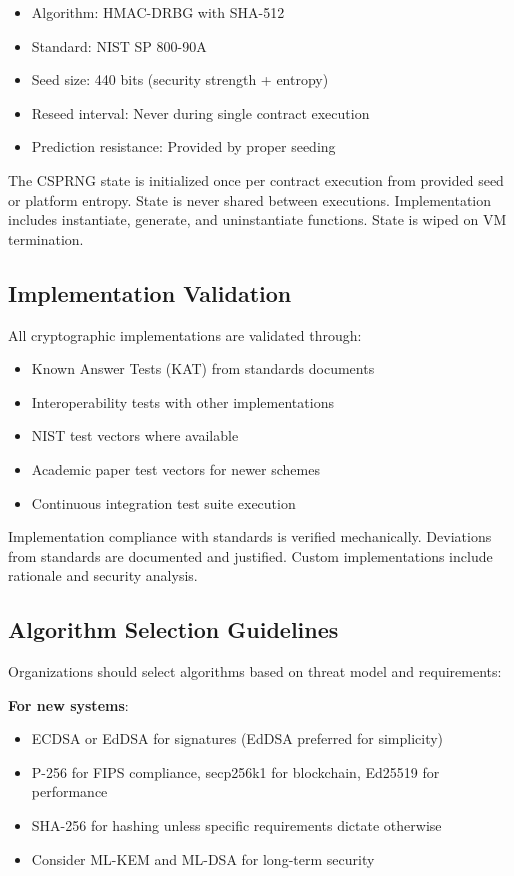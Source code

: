 \begin{itemize}
\item Algorithm: HMAC-DRBG with SHA-512
\item Standard: NIST SP 800-90A
\item Seed size: 440 bits (security strength + entropy)
\item Reseed interval: Never during single contract execution
\item Prediction resistance: Provided by proper seeding
\end{itemize}

The CSPRNG state is initialized once per contract execution from
provided seed or platform entropy. State is never shared between
executions. Implementation includes instantiate, generate, and
uninstantiate functions. State is wiped on VM termination.

\subsection{Implementation Validation}

All cryptographic implementations are validated through:

\begin{itemize}
\item Known Answer Tests (KAT) from standards documents
\item Interoperability tests with other implementations
\item NIST test vectors where available
\item Academic paper test vectors for newer schemes
\item Continuous integration test suite execution
\end{itemize}

Implementation compliance with standards is verified
mechanically. Deviations from standards are documented and
justified. Custom implementations include rationale and security
analysis.

\subsection{Algorithm Selection Guidelines}

Organizations should select algorithms based on threat model and
requirements:

\textbf{For new systems}:
\begin{itemize}
\item ECDSA or EdDSA for signatures (EdDSA preferred for simplicity)
\item P-256 for FIPS compliance, secp256k1 for blockchain, Ed25519 for
  performance
\item SHA-256 for hashing unless specific requirements dictate
  otherwise
\item Consider ML-KEM and ML-DSA for long-term security
\end{itemize}

